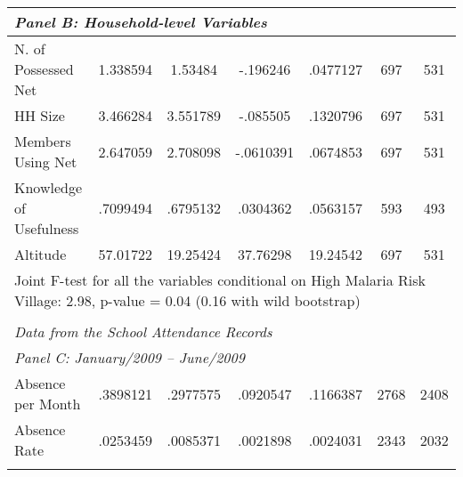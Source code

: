 {\begin{tabular}{l*{1}{cccccc}}
\multicolumn{6}{l}{{\it Panel B: Household-level Variables}} \\
\hline
N. of Possessed Net  &    1.338594&     1.53484&    -.196246\sym{**}&    .0477127&         697&         531\\
HH Size             &    3.466284&    3.551789&    -.085505&     .1320796&         697&         531\\
Members Using Net   &    2.647059&    2.708098&   -.0610391&    .0674853&         697&         531\\
Knowledge of Usefulness&    .7099494&    .6795132&    .0304362&    .0563157&         593&         493\\
Altitude            &    57.01722&    19.25424&    37.76298\sym{+}&     19.24542&         697&         531\\
\multicolumn{7}{l}{Joint F-test for all the variables conditional on High Malaria Risk Village: 2.98, p-value = 0.04 (0.16 with wild bootstrap)} \\
\\

              \multicolumn{6}{l}{\it Data from the School Attendance Records}        \\ 
\hline

              \multicolumn{6}{l}{{\it Panel C: January/2009 -- June/2009}  } \\

\hline

Absence per Month   &    .3898121&    .2977575&    .0920547&    .1166387 &        2768&        2408\\
Absence Rate          &    .0253459&    .0085371&    .0021898&    .0024031&        2343&        2032\\
\\


\end{tabular}}
